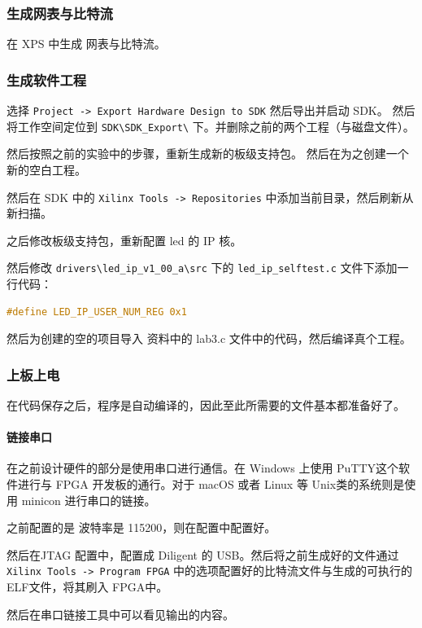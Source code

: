 \documentclass{ctexart}
\begin{document}
\subsubsection{生成网表与比特流}

在 XPS 中生成 网表与比特流。

\subsubsection{生成软件工程}

选择 \verb|Project -> Export Hardware Design to SDK| 然后导出并启动 SDK。
然后将工作空间定位到 \verb|SDK\SDK_Export\| 下。并删除之前的两个工程（与磁盘文件）。

然后按照之前的实验中的步骤，重新生成新的板级支持包。
然后在为之创建一个新的空白工程。

然后在 SDK 中的 \verb|Xilinx Tools -> Repositories| 中添加当前目录，然后刷新从新扫描。

之后修改板级支持包，重新配置 led 的 IP 核。

然后修改 \verb|drivers\led_ip_v1_00_a\src| 下的 \verb|led_ip_selftest.c| 文件下添加一行代码：
\begin{lstlisting}[language=C]
#define LED_IP_USER_NUM_REG 0x1
\end{lstlisting}

然后为创建的空的项目导入 资料中的 lab3.c 文件中的代码，然后编译真个工程。



\subsubsection{上板上电}

在代码保存之后，程序是自动编译的，因此至此所需要的文件基本都准备好了。
        
        \paragraph{链接串口}
        
        在之前设计硬件的部分是使用串口进行通信。在 Windows 上使用
        PuTTY这个软件进行与 FPGA 开发板的通行。对于 macOS 或者 Linux
        等 Unix类的系统则是使用 minicon 进行串口的链接。
        
        之前配置的是 波特率是 115200，则在配置中配置好。
        
        然后在JTAG 配置中，配置成 Diligent 的 USB。然后将之前生成好的文件通过
        \verb|Xilinx Tools -> Program FPGA|  中的选项配置好的比特流文件与生成的可执行的ELF文件，将其刷入 FPGA中。

        然后在串口链接工具中可以看见输出的内容。
\end{document}
